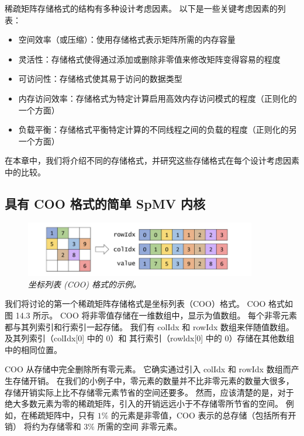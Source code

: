 稀疏矩阵存储格式的结构有多种设计考虑因素。 以下是一些关键考虑因素的列表：
\begin{itemize}
   \item 空间效率（或压缩）：使用存储格式表示矩阵所需的内存容量

   \item 灵活性：存储格式使得通过添加或删除非零值来修改矩阵变得容易的程度

   \item 可访问性：存储格式使其易于访问的数据类型

   \item 内存访问效率：存储格式为特定计算启用高效内存访问模式的程度（正则化的一个方面）

   \item 负载平衡：存储格式平衡特定计算的不同线程之间的负载的程度（正则化的另一个方面）

\end{itemize}

在本章中，我们将介绍不同的存储格式，并研究这些存储格式在每个设计考虑因素中的比较。

\subsection{具有 COO 格式的简单 SpMV 内核}
\begin{figure}[H]
	\centering
	\includegraphics[width=0.9\textwidth]{figs/F14.3.png}
	\caption{\textit{坐标列表 (COO) 格式的示例。}}
\end{figure}

我们将讨论的第一个稀疏矩阵存储格式是坐标列表（COO）格式。 COO 格式如图 14.3 所示。 
COO 将非零值存储在一维数组中，显示为值数组。 每个非零元素都与其列索引和行索引一起存储。 
我们有 colIdx 和 rowIdx 数组来伴随值数组。 
 及其列索引（colIdx[0] 中的 0）和 其行索引（rowldx[0] 中的 0）存储在其他数组中的相同位置。

COO 从存储中完全删除所有零元素。 它确实通过引入 colIdx 和 rowIdx 数组而产生存储开销。 
在我们的小例子中，零元素的数量并不比非零元素的数量大很多，存储开销实际上比不存储零元素节省的空间还要多。 
然而，应该清楚的是，对于绝大多数元素为零的稀疏矩阵，引入的开销远远小于不存储零所节省的空间。 
例如，在稀疏矩阵中，只有 $1 \%$ 的元素是非零值，COO 表示的总存储（包括所有开销）
将约为存储零和 $3 \%$ 所需的空间 非零元素。

